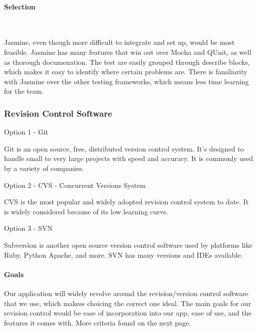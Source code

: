 \documentclass[letterpaper, 10pt, draftclsnofoot, compsoc, onecolumn]{IEEEtran}
\begin{document}
{\medskip
\paragraph{Selection} ~\\
{\noindent Jasmine, even though more difficult to integrate and set up, would be most feasible. Jasmine has many features that win 
out over Mocha and QUnit, as well as thorough documenation. The test are easily grouped through describe blocks, which makes it easy 
to identify where certain problems are. There is familiarity with Jasmine over the other testing frameworks, which means less time learning 
for the team.\par}


\medskip

\newpage
\subsubsection{Revision Control Software}

{\noindent Option 1 - Git \par}
{\noindent Git is an open source, free, distributed version control system. It's designed to handle small to very large projects with speed and accuracy.
It is commonly used by a variety of companies. \cite{Git} \par}

\medskip
{\noindent Option 2 - CVS - Concurrent Versions System \par}
{\noindent CVS is the most popular and widely adopted revision control system to date. It is widely considered because of its low learning curve. \cite{JaxEnter}  \par}

\medskip
{\noindent Option 3 - SVN \par}
{\noindent Subversion is another open source version control software used by platforms like Ruby, Python Apache, and more. SVN has many versions and IDEs available. \cite{SVN} \par}

\medskip
\paragraph{Goals}
{\noindent Our application will widely revolve around the revision/version control software that we use, which makess choicing the correct one ideal. 
The main goals for our revision control would be ease of incorporation into our app, ease of use, and the features it comes with. More criteria found on the next page. \par}

}
\end{document}
